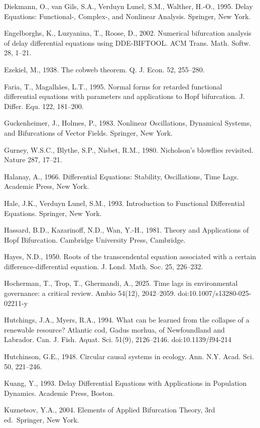 \documentclass[11pt]{article}
\begin{document}
Diekmann, O., van Gils, S.A., Verduyn Lunel, S.M., Walther, H.-O., 1995.
Delay Equations: Functional-, Complex-, and Nonlinear Analysis.
Springer, New York.

Engelborghs, K., Luzyanina, T., Roose, D., 2002. Numerical bifurcation
analysis of delay differential equations using DDE-BIFTOOL. ACM Trans.
Math. Softw. 28, 1--21.

Ezekiel, M., 1938. The cobweb theorem. Q. J. Econ. 52, 255--280.

Faria, T., Magalh\~aes, L.T., 1995. Normal forms for retarded functional
differential equations with parameters and applications to Hopf
bifurcation. J. Differ. Equ. 122, 181--200.

Guckenheimer, J., Holmes, P., 1983. Nonlinear Oscillations, Dynamical
Systems, and Bifurcations of Vector Fields. Springer, New York.

Gurney, W.S.C., Blythe, S.P., Nisbet, R.M., 1980. Nicholson's blowflies
revisited. Nature 287, 17--21.

Halanay, A., 1966. Differential Equations: Stability, Oscillations, Time
Lags. Academic Press, New York.

Hale, J.K., Verduyn Lunel, S.M., 1993. Introduction to Functional
Differential Equations. Springer, New York.

Hassard, B.D., Kazarinoff, N.D., Wan, Y.-H., 1981. Theory and
Applications of Hopf Bifurcation. Cambridge University Press, Cambridge.

Hayes, N.D., 1950. Roots of the transcendental equation associated with
a certain difference-differential equation. J. Lond. Math. Soc. 25,
226--232.

Hocherman, T., Trop, T., Ghermandi, A., 2025. Time lags in environmental
governance: a critical review. Ambio 54(12), 2042--2059.
doi:10.1007/s13280-025-02211-y

Hutchings, J.A., Myers, R.A., 1994. What can be learned from the
collapse of a renewable resource? Atlantic cod, Gadus morhua, of
Newfoundland and Labrador. Can. J. Fish. Aquat. Sci. 51(9), 2126--2146.
doi:10.1139/f94-214

Hutchinson, G.E., 1948. Circular causal systems in ecology. Ann. N.Y.
Acad. Sci. 50, 221--246.

Kuang, Y., 1993. Delay Differential Equations with Applications in
Population Dynamics. Academic Press, Boston.

Kuznetsov, Y.A., 2004. Elements of Applied Bifurcation Theory, 3rd
ed.~Springer, New York.
\end{document}
